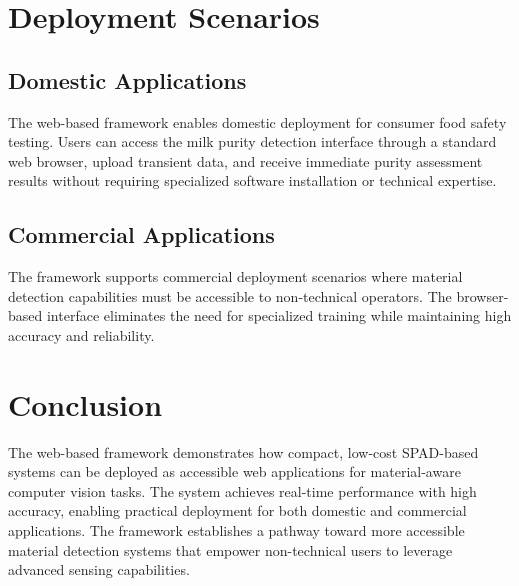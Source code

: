 \documentclass[10pt,twocolumn]{article}
\begin{document}
\section{Deployment Scenarios}

\subsection{Domestic Applications}

The web-based framework enables domestic deployment for consumer food safety testing. Users can access the milk purity detection interface through a standard web browser, upload transient data, and receive immediate purity assessment results without requiring specialized software installation or technical expertise.

\subsection{Commercial Applications}

The framework supports commercial deployment scenarios where material detection capabilities must be accessible to non-technical operators. The browser-based interface eliminates the need for specialized training while maintaining high accuracy and reliability.

\section{Conclusion}

The web-based framework demonstrates how compact, low-cost SPAD-based systems can be deployed as accessible web applications for material-aware computer vision tasks. The system achieves real-time performance with high accuracy, enabling practical deployment for both domestic and commercial applications. The framework establishes a pathway toward more accessible material detection systems that empower non-technical users to leverage advanced sensing capabilities.



\end{document}
